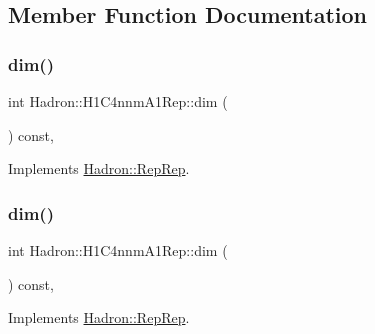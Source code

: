 \subsection{Member Function Documentation}
\mbox{\label{structHadron_1_1H1C4nnmA1Rep_a9a5bd4bd14a8dc6d5eeb39b67b005087}} 
\subsubsection{\texorpdfstring{dim()}{dim()}\hspace{0.1cm}{\footnotesize\ttfamily [1/5]}}
{\footnotesize\ttfamily int Hadron\+::\+H1\+C4nnm\+A1\+Rep\+::dim (\begin{DoxyParamCaption}{ }\end{DoxyParamCaption}) const\hspace{0.3cm}{\ttfamily [inline]}, {\ttfamily [virtual]}}



Implements \mbox{\hyperlink{structHadron_1_1RepRep_a92c8802e5ed7afd7da43ccfd5b7cd92b}{Hadron\+::\+Rep\+Rep}}.

\mbox{\label{structHadron_1_1H1C4nnmA1Rep_a9a5bd4bd14a8dc6d5eeb39b67b005087}} 
\subsubsection{\texorpdfstring{dim()}{dim()}\hspace{0.1cm}{\footnotesize\ttfamily [2/5]}}
{\footnotesize\ttfamily int Hadron\+::\+H1\+C4nnm\+A1\+Rep\+::dim (\begin{DoxyParamCaption}{ }\end{DoxyParamCaption}) const\hspace{0.3cm}{\ttfamily [inline]}, {\ttfamily [virtual]}}



Implements \mbox{\hyperlink{structHadron_1_1RepRep_a92c8802e5ed7afd7da43ccfd5b7cd92b}{Hadron\+::\+Rep\+Rep}}.

\mbox{\label{structHadron_1_1H1C4nnmA1Rep_a9a5bd4bd14a8dc6d5eeb39b67b005087}} 
